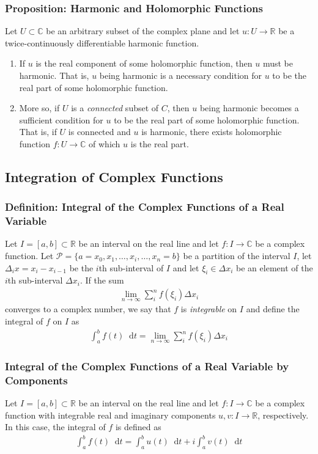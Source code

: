 \documentclass[11pt, a4paper]{article}
\newcommand{\diff}{\mathop{}\!\mathrm{d}} %
\newcommand{\R}{\mathbb{R}} %
\newcommand{\C}{\mathbb{C}} %
\begin{document}
\subsubsection{Proposition: Harmonic and Holomorphic Functions}
Let $  U \subset \C $ be an arbitrary subset of the complex plane and let $ u: U \to \R $ be a twice-continuously differentiable harmonic function.
\begin{enumerate}
	\item If $ u $ is the real component of some holomorphic function, then $ u $ must be harmonic. That is, $ u $ being harmonic is a necessary condition for $ u $ to be the real part of some holomorphic function.
	\item More so, if $ U $ is a \textit{connected} subset of $ C $, then $ u $ being harmonic becomes a sufficient condition for $ u $ to be the real part of some holomorphic function. That is, if $ U $ is connected and $ u $ is harmonic, there exists holomorphic function $ f : U \to \C $ of which $ u $ is the real part.
\end{enumerate}

\subsection{Integration of Complex Functions}

\subsubsection{Definition: Integral of the Complex Functions of a Real Variable}
Let $ I = [a, b] \subset \R $ be an interval on the real line and let $ f:I \to \C $ be a complex function. Let $ \mathcal{P} = \{a = x_0, x_1, \dots, x_i, \dots, x_n = b \} $ be a partition of the interval $ I $, let $ \Delta_i x = x_i - x_{i-1} $ be the $ i $th sub-interval of $ I $ and let $ \xi_i \in \Delta x_i$ be an element of the $ i $th sub-interval $ \Delta x_i $. If the sum
\begin{align*}
	\lim_{n \to \infty} \sum_{i}^{n}f(\xi_i) \Delta x_i
\end{align*}
converges to a complex number, we say that $ f $ is \textit{integrable} on $ I $ and define the integral of $ f $ on $ I $ as
\begin{align*}
	\int_{a}^{b} f(t) \diff t = \lim_{n \to \infty} \sum_{i}^{n}f(\xi_i) \Delta x_i
\end{align*}

\subsubsection{Integral of the Complex Functions of a Real Variable by Components}
Let $ I = [a, b] \subset \R $ be an interval on the real line and let $ f:I \to \C $ be a complex function with integrable real and imaginary components $ u, v : I \to \R $, respectively. In this case, the integral of $ f $ is defined as
\begin{align*}
	\int_{a}^{b} f(t) \diff t = \int_{a}^{b}u(t) \diff t + i\int_{a}^{b}v(t) \diff t
\end{align*}
\end{document}
